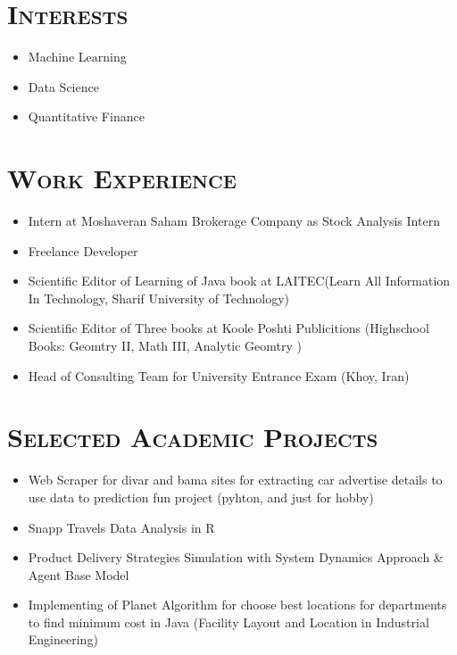 \documentclass[line,margin]{res}
\begin{document}
\begin{resume}
\begin{spacing}{1.1}
\section{\textsc{Interests}}
\begin{itemize}
\item Machine Learning
\item Data Science
\item Quantitative Finance
\end{itemize}

\section{\textsc{Work Experience}}
\begin{itemize}
\item Intern at Moshaveran Saham Brokerage Company as Stock Analysis Intern
\item Freelance Developer
\item Scientific Editor of Learning of Java book at LAITEC(Learn All Information In Technology, Sharif University of Technology)
\item Scientific Editor of Three books at Koole Poshti Publicitions (Highschool Books: Geomtry II, Math III, Analytic Geomtry )
\item Head of Consulting Team for University Entrance Exam (Khoy, Iran)

\end{itemize}

\section{\textsc{Selected Academic Projects}}
\begin{itemize}
\item Web Scraper for divar and bama sites for extracting car advertise details  to use data to prediction fun project (pyhton, and just for hobby)
\item Snapp Travels Data Analysis in R
\item Product Delivery Strategies Simulation with System Dynamics Approach \& Agent Base Model
\item  Implementing of Planet Algorithm for choose best locations for departments to find minimum cost in Java (Facility Layout and Location in Industrial Engineering)


\end{itemize}
\end{spacing}
\end{resume}
\end{document}
